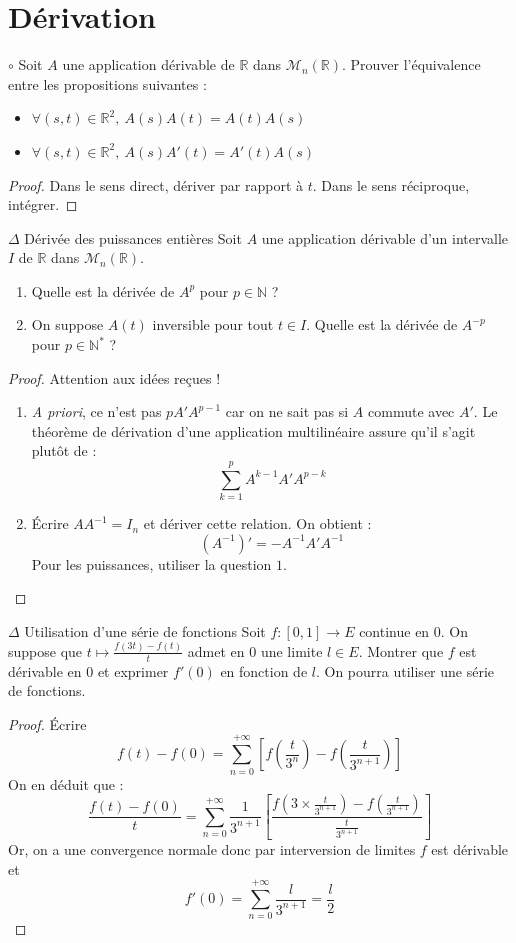 \documentclass[french,a4paper]{article}
\newcommand{\N}{\mathbb{N}}
\newcommand{\R}{\mathbb{R}}
\newcommand{\st}{^*}
\newcommand{\inv}{^{-1}}
\theoremstyle{plain}
\theoremstyle{definition}
\theoremstyle{remark}
\begin{document}
\section{Dérivation}

\begin{ex}[Moulin.FV.07]{$\circ$}
	Soit $A$ une application dérivable de $\R$ dans $\mathcal{M}_n(\R)$. Prouver l'équivalence entre les propositions suivantes :
	\begin{itemize}
		\item $\forall (s,t)\in\R^2,\ A(s)A(t)=A(t)A(s)$ 
		\item $\forall (s,t)\in\R^2,\ A(s)A'(t)=A'(t)A(s)$
	\end{itemize}
\end{ex}
\begin{proof}
	Dans le sens direct, dériver par rapport à $t$. Dans le sens réciproque, intégrer.
\end{proof}

\begin{ex}[Moulin.FV.08]{$\Delta$ Dérivée des puissances entières}
	Soit $A$ une application dérivable d'un intervalle $I$ de $\R$ dans $\mathcal{M}_n(\R)$.
	\begin{enumerate}
		\item Quelle est la dérivée de $A^p$ pour $p\in\N$ ?
		\item On suppose $A(t)$ inversible pour tout $t\in I$. Quelle est la dérivée de $A^{-p}$ pour $p\in\N\st$ ?
	\end{enumerate}
\end{ex}
\begin{proof}
	Attention aux idées reçues !
	\begin{enumerate}
		\item \textit{A priori}, ce n'est pas $pA'A^{p-1}$ car on ne sait pas si $A$ commute avec $A'$. Le théorème de dérivation d'une application multilinéaire assure qu'il s'agit plutôt de : $$\sum_{k=1}^pA^{k-1}A'A^{p-k}$$
		\item Écrire $AA\inv=I_n$ et dériver cette relation. On obtient : $$(A\inv)'=-A\inv A' A\inv$$ Pour les puissances, utiliser la question $1$.
	\end{enumerate}
\end{proof}

\begin{ex}[Moulin.FV.09]{$\Delta$ Utilisation d'une série de fonctions}
	Soit $f:[0,1]\to E$ continue en $0$. On suppose que $t\mapsto\displaystyle\frac{f(3t)-f(t)}{t}$ admet en $0$ une limite $l\in E$. Montrer que $f$ est dérivable en $0$ et exprimer $f'(0)$ en fonction de $l$. On pourra utiliser une série de fonctions.
\end{ex}
\begin{proof}
	Écrire $$f(t)-f(0)=\sum_{n=0}^{+\infty}\left[f\left(\frac{t}{3^{n}}\right)-f\left(\frac{t}{3^{n+1}}\right)\right]$$ On en déduit que : $$\frac{f(t)-f(0)}{t}=\sum_{n=0}^{+\infty}\frac{1}{3^{n+1}}\left[\frac{\displaystyle f\left(3\times\frac{t}{3^{n+1}}\right)-f\left(\frac{t}{3^{n+1}}\right)}{\displaystyle\frac{t}{3^{n+1}}}\right]$$ Or, on a une convergence normale donc par interversion de limites $f$ est dérivable et $$f'(0)=\sum_{n=0}^{+\infty}\frac{l}{3^{n+1}}=\frac{l}{2}$$
\end{proof}
\end{document}
